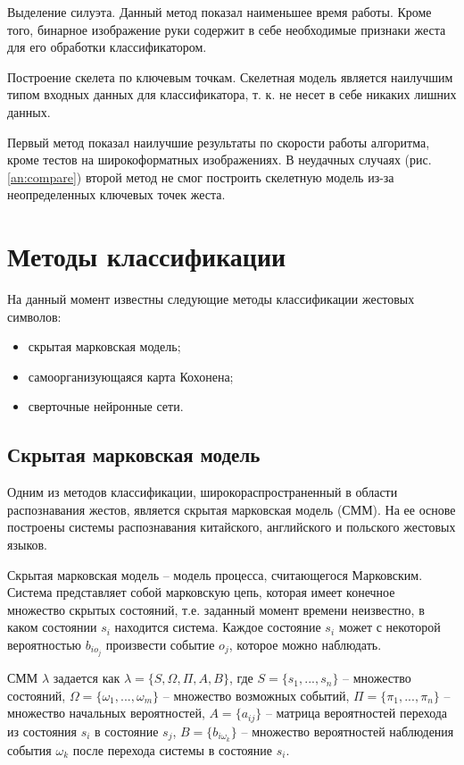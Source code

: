 Выделение силуэта. Данный метод показал наименьшее время работы. Кроме того, бинарное изображение руки содержит в себе необходимые признаки жеста для его обработки классификатором.

Построение скелета по ключевым точкам. Скелетная модель является наилучшим типом входных данных для классификатора, т. к. не несет в себе никаких лишних данных\cite{Gil}.

Первый метод показал наилучшие результаты по скорости работы алгоритма,
кроме тестов на широкоформатных изображениях. В неудачных случаях (рис. \ref{an:compare}) второй метод не смог построить скелетную модель из-за неопределенных ключевых точек жеста.

\section{Методы классификации}

На данный момент известны следующие методы классификации жестовых символов:

\begin{itemize}
	\item скрытая марковская модель\cite{Zhang,Kasprzak};
	\item самоорганизующаяся карта Кохонена\cite{Tewari2012AVR,Karn,Starner};
	\item сверточные нейронные сети\cite{Potkin,10.1007/978-3-319-16178-5_40}.
\end{itemize}

\subsection{Скрытая марковская модель}

Одним из методов классификации, широкораспространенный в области распознавания жестов, является скрытая марковская модель (СММ). На ее основе построены системы распознавания китайского\cite{Zhang}, английского\cite{Starner} и польского\cite{Kasprzak} жестовых языков.

Скрытая марковская модель -- модель процесса, считающегося Марковским. Система представляет собой марковскую цепь, которая имеет конечное множество скрытых состояний, т.е. заданный момент времени неизвестно, в каком состоянии $s_i$ находится система. Каждое состояние $s_i$ может с некоторой вероятностью $b_{io_j}$ произвести событие $o_j$, которое можно наблюдать.

СММ $\lambda$ задается как $\lambda = \{S, \Omega, \Pi, A, B\}$, где $S=\{s_1, ..., s_n\}$ -- множество состояний, $\Omega = \{\omega_1, ..., \omega_m\}$ -- множество возможных событий, $\Pi = \{\pi_1, ..., \pi_n\}$ -- множество начальных вероятностей, $A = \{a_{ij}\}$ -- матрица вероятностей перехода из состояния $s_i$ в состояние $s_j$, $B = \{b_{i\omega_k}\}$ -- множество вероятностей наблюдения события $\omega_k$ после перехода системы в состояние $s_i$.

